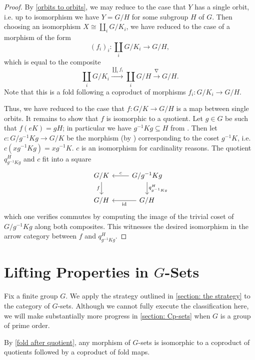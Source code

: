 \documentclass{amsart}
\DeclareMathOperator{\id}{id}
\numberwithin{equation}{section}
\theoremstyle{definition}
\begin{document}
\begin{proof}
	By \cref{orbits to orbits}, we may reduce to the case that $Y$ has a single orbit, i.e. up to isomorphism we have $Y = G/H$ for some subgroup $H$ of $G$. Then choosing an isomorphism $X \cong \coprod_i G/K_i$, we have reduced to the case of a morphism of the form
	\[
		(f_i)_i \colon \coprod_i G/K_i \to G/H,
	\]
	which is equal to the composite
	\[
		\coprod_i G/K_i \xrightarrow{\coprod_i f_i} \coprod_i G/H \xrightarrow{\nabla} G/H.
	\]
	Note that this is a fold following a coproduct of morphisms $f_i \colon G/K_i \to G/H$.

	Thus, we have reduced to the case that $f \colon G/K \to G/H$ is a map between single orbits. It remains to show that $f$ is isomorphic to a quotient. Let $g \in G$ be such that $f(eK) = gH$; in particular we have $g^{-1}Kg \subseteq H$ from . Then let $c \colon G/g^{-1}Kg \to G/K$ be the morphism (by ) corresponding to the coset $g^{-1}K$, i.e. $c(xg^{-1}Kg) = xg^{-1}K$. $c$ is an isomorphism for cardinality reasons. The quotient $q^H_{g^{-1}Kg}$ and $c$ fit into a square
	\[
		\begin{tikzcd}
			G/K \ar[d, "f"'] & G/g^{-1}K g \ar[l, "c"'] \ar[d, "q^H_{g^{-1}Kg}"] \\
			G/H & G/H \ar[l, "\id"]
		\end{tikzcd}
	\]
	which one verifies commutes by computing the image of the trivial coset of $G/g^{-1}Kg$ along both composites. This witnesses the desired isomorphism in the arrow category between $f$ and $q^H_{g^{-1}Kg}$.
\end{proof}

\section{Lifting Properties in \texorpdfstring{$G$}{G}-Sets}
\label{section: lifting properties in G-sets}

Fix a finite group $G$. We apply the strategy outlined in \cref{section: the strategy} to the category of $G$-sets. Although we cannot fully execute the classification here, we will make substantially more progress in \cref{section: Cp-sets} when $G$ is a group of prime order.

By \cref{fold after quotient}, any morphism of $G$-sets is isomorphic to a coproduct of quotients followed by a coproduct of fold maps.
\end{document}
